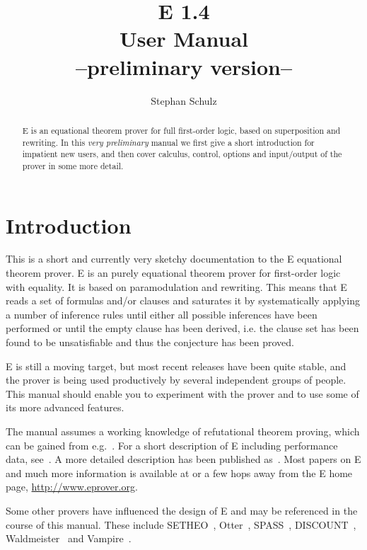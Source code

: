 \documentclass{article}
\author{Stephan Schulz}
\title{E 1.4\\[1.5ex]User Manual\\[1.5ex]{\normalsize --preliminary
    version--}}
\begin{document}
\maketitle{}

\begin{abstract}
  E is an equational theorem prover for full first-order logic, based
  on superposition and rewriting. In this \emph{very preliminary}
  manual we first give a short introduction for impatient new users,
  and then cover calculus, control, options and input/output of the
  prover in some more detail.
\end{abstract}

\tableofcontents{}

\section{Introduction}
\label{sec:intro}

This is a short and currently very sketchy documentation to the E
equational theorem prover. E is an purely equational theorem prover
for first-order logic with equality. It is based on paramodulation and
rewriting. This means that E reads a set of formulas and/or clauses
and saturates it by systematically applying a number of inference
rules until either all possible inferences have been performed or
until the empty clause has been derived, i.e. the clause set has been
found to be unsatisfiable and thus the conjecture has been proved.

E is still a moving target, but most recent releases have been quite
stable, and the prover is being used productively by several
independent groups of people. This manual should enable you to
experiment with the prover and to use some of its more advanced
features.

The manual assumes a working knowledge of refutational theorem
proving, which can be gained from e.g.~\cite{CL73}. For a short
description of E including performance data,
see~\cite{Schulz:IJCAR-2004}. A more detailed description has been
published as~\cite{Schulz:AICOM-2002}. Most papers on E and much more
information is available at or a few hops away from the E home page,
\url{http://www.eprover.org}.

Some other provers have influenced the design of E and may be
referenced in the course of this manual. These include
SETHEO~\cite{MILSGSM:JAR-97}, Otter~\cite{Mc94,MW:JAR-97},
SPASS~\cite{WGR96,WABCEKTT:CADE-99}, DISCOUNT~\cite{DKS97},
Waldmeister~\cite{BHF96,HJL:CADE-99} and
Vampire~\cite{RV:AICOM-2002,RV:IJCAR-2001}.
\end{document}
